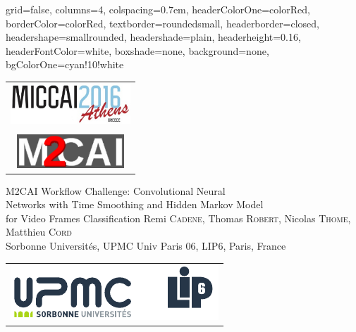 \documentclass[landscape,a0paper,fontscale=0.292]{baposter}
\begin{document}
\begin{poster}{
 grid=false,
 columns=4,
 colspacing=0.7em,
 headerColorOne=colorRed,
 borderColor=colorRed,
 textborder=roundedsmall,
 headerborder=closed,
 headershape=smallrounded,
 headershade=plain,
 headerheight=0.16\textheight,
 headerFontColor=white,
 boxshade=none,
 background=none,
 bgColorOne=cyan!10!white}
 { 
    \begin{tabular}{c}
      \hspace{0.5cm}\includegraphics[width=4.5cm]{logo/logo_miccai.png} \\ \vspace{-.2cm}
      \\
      \hspace{0.2cm}\includegraphics[width=4cm]{logo/logo_m2cai.png}
    \end{tabular}
 }
 {\sc \fontsize{0.7cm}{0.6cm}\selectfont M2CAI Workflow Challenge: Convolutional Neural \\ {\fontsize{0.7cm}{0.6cm}\selectfont Networks with Time Smoothing and Hidden Markov Model} \\for Video Frames Classification }
 {Remi \textsc{Cadene}, Thomas \textsc{Robert}, Nicolas \textsc{Thome}, Matthieu \textsc{Cord} \vspace{0.1cm}\\
 {\small Sorbonne Universit\'{e}s, UPMC Univ Paris 06, LIP6, Paris, France}
 } %
 {
    \begin{tabular}{c}
          \hspace{-5mm}
      \includegraphics[height=0.075\textheight]{logo/logos.pdf}  \\

\end{tabular}}
\end{poster}
\end{document}
